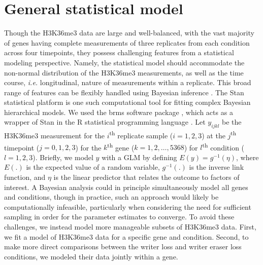 \documentclass[12pt]{extarticle}
\newcommand{\ie}{\emph{i.e.}\xspace}
\begin{document}
\section*{General statistical model}
Though the H3K36me3 data are large and well-balanced, with the vast majority of genes having complete measurements of three replicates from each condition across four timepoints, they possess challenging features from a statistical modeling perspective. Namely, the statistical model should accommodate the non-normal distribution of the H3K36me3 measurements, as well as the time course, \ie longitudinal, nature of measurements within a replicate. This broad range of features can be flexibly handled using Bayesian inference \cite{Gelman2006}. 
	The Stan statistical platform \cite{Carpenter2017} is one such computational tool for fitting complex Bayesian hierarchical models. We used the brms software package \cite{Burkner2017, Burkner2018}, which acts as a wrapper of Stan in the R statistical programming language \cite{RCoreTeam2019}. Let $y_{ijkl}$ be the H3K36me3 measurement for the $i$\textsuperscript{th} replicate sample ($i=1,2,3$) at the $j$\textsuperscript{th} timepoint ($j=0,1,2,3$) for the $k$\textsuperscript{th} gene ($k=1,2,…,5368$) for $l$\textsuperscript{th} condition ($l=1,2,3$). Briefly, we model $y$ with a GLM by defining $E(y)=g^{-1}(\eta)$, where $E(.)$ is the expected value of a random variable, $g^{-1}(.)$ is the inverse link function, and $\eta$ is the linear predictor that relates the outcome to factors of interest.
	A Bayesian analysis could in principle simultaneously model all genes and conditions, though in practice, such an approach would likely be computationally infeasible, particularly when considering the need for sufficient sampling in order for the parameter estimates to converge. To avoid these challenges, we instead model more manageable subsets of H3K36me3 data. First, we fit a model of H3K36me3 data for a specific gene and condition. Second, to make more direct comparisons between the writer loss and writer eraser loss conditions, we modeled their data jointly within a gene.
	
\end{document}
